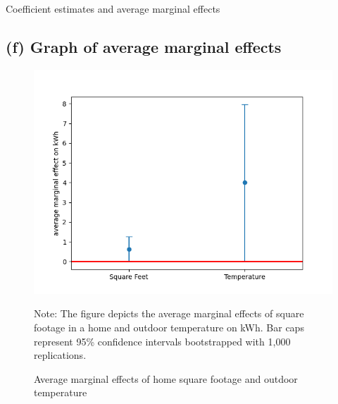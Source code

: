 \documentclass{article}
\begin{document}
\begin{table}[ht]
\centering
\caption{Coefficient estimates and average marginal effects}
\begin{threeparttable}

\end{threeparttable}  
\label{tab:py_ests}
\end{table}

\newpage
\subsection*{(f) Graph of average marginal effects}

\begin{figure}[!ht]
    \centering
    \includegraphics[scale = 0.7]{ame_plot.png}
    \caption{Average marginal effects of home square footage and outdoor temperature}
    \vspace{0.3cm}
    \begin{minipage}{0.78\textwidth}
        \footnotesize Note: The figure depicts the average marginal effects of square footage in a home and outdoor temperature on kWh. Bar caps represent 95\% confidence intervals bootstrapped with 1,000 replications.
    \end{minipage}
    \label{fig:ame_plot}
\end{figure}

% 
% 
\end{document}

